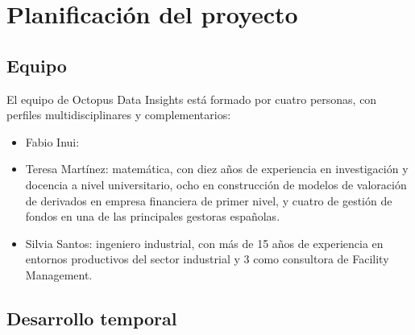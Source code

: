 \chapter{Planificación del proyecto}
\section{Equipo}
El equipo de Octopus Data Insights está formado por cuatro personas, con perfiles multidisciplinares y complementarios:
\begin{itemize}
\item Fabio Inui: 
\item Teresa Martínez: matemática, con diez años de experiencia en investigación y docencia a nivel universitario,
ocho en construcción de modelos de valoración de derivados en empresa financiera de primer nivel, y cuatro de
gestión de fondos en una de las principales gestoras españolas.
\item Silvia Santos: ingeniero industrial, con más de 15 años de experiencia en entornos productivos del sector industrial y 3 como consultora de Facility Management.
\end{itemize}

\section{Desarrollo temporal}

